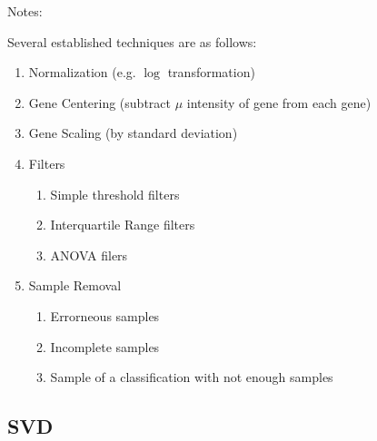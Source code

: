 \documentclass[serif]{beamer}
\begin{document}
	\begin{frame}
		\begin{block}{Notes:}
			
			Several established techniques are as follows:
			
			\begin{enumerate}
				\item
				{
					\color<2->{blockgray}
					{
						Normalization (e.g. $\log$ transformation)
					}
				}
				\item
				{	
					\color<1,3->{blockgray}
					{					
						Gene Centering (subtract $\mu$
						intensity of gene from each gene)
					}
				}
				\item
				{
					\color<1-2,4->{blockgray}
					{
						Gene Scaling (by standard deviation)
					}
				}
				\item
				{
					{
						Filters
					}
					\begin{enumerate}
						\item
						{
							\color<1-3,5>{blockgray}
							{
								Simple threshold filters
							}
						}
						\item 
						{
							\color<1-3,5>{blockgray}
							{
								Interquartile Range filters
							}
						}
						\item
						{
							\color<1-3,5>{blockgray}
							{
								ANOVA filers
							}
						}
					\end{enumerate}
				}
				\item 
				{
					{
						Sample Removal
					}
					\begin{enumerate}
						\item
						{
							\color<1-4>{blockgray}
							{
								Errorneous samples
							}
						}
						\item
						{
							\color<1-4>{blockgray}
							{
								Incomplete samples
							}
						}
						\item
						{
							\color<1-4>{blockgray}
							{
								Sample of a classification with not enough samples
							}
						}
					\end{enumerate}
				}
			\end{enumerate}
		\end{block}
		
	\end{frame}

	\subsection{SVD}
\end{document}
